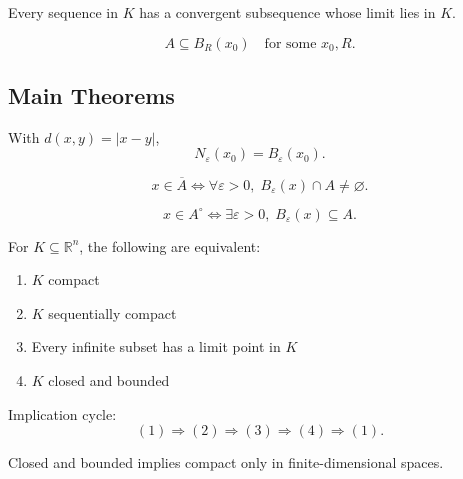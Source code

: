 \begin{definition}
Every sequence in $K$ has a convergent subsequence whose limit lies in $K$.
\end{definition}

\begin{definition}
\[
A \subseteq B_R(x_0)
\quad\text{for some } x_0,R.
\]
\end{definition}

\subsection{Main Theorems}

\begin{theorem}[Neighborhood = ball in $\mathbb{R}$]
With $d(x,y)=|x-y|$,
\[
N_\varepsilon(x_0)=B_\varepsilon(x_0).
\]
\end{theorem}

\begin{theorem}
\[
x\in \overline{A}
\iff
\forall \varepsilon>0,\;
B_\varepsilon(x)\cap A\neq\varnothing.
\]
\end{theorem}

\begin{theorem}
\[
x\in A^\circ
\iff
\exists \varepsilon>0,\;
B_\varepsilon(x)\subseteq A.
\]
\end{theorem}

\begin{theorem}
For $K\subseteq\mathbb{R}^n$, the following are equivalent:

\begin{enumerate}
\item $K$ compact
\item $K$ sequentially compact
\item Every infinite subset has a limit point in $K$
\item $K$ closed and bounded
\end{enumerate}

Implication cycle:
\[
(1)\Rightarrow(2)\Rightarrow(3)\Rightarrow(4)\Rightarrow(1).
\]
\end{theorem}



\begin{remark}
Closed and bounded implies compact only in finite-dimensional spaces.
\end{remark}

